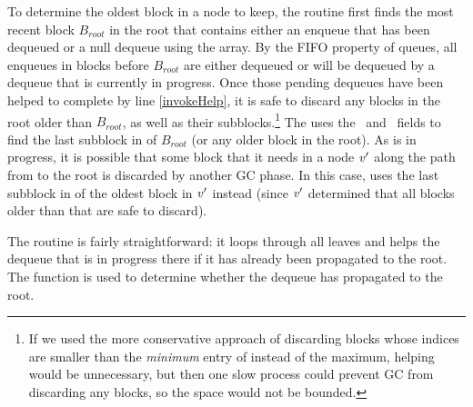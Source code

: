 To determine the oldest block in a node  to keep, the  routine  first
finds the most recent block $B_{root}$ in the root that contains either an enqueue that has been dequeued
or a null dequeue using the  array.  By the FIFO property of queues, all enqueues in blocks before $B_{root}$ are either
dequeued or will be dequeued by a dequeue that is currently in progress.  Once those pending dequeues have been
helped to complete by line \ref{invokeHelp},
it is safe to discard any blocks in the root older than $B_{root}$, as well
as their subblocks.\footnote{If we used the more conservative approach of discarding blocks whose indices 
are smaller than the \emph{minimum} entry of  instead of the maximum, helping would be unnecessary, but then one slow process could prevent GC from discarding any blocks, so the space would not be bounded.}
The  uses the \eleft\ and \eright\ fields to find the last subblock in 
of $B_{root}$ (or any older block in the root).
As  is in progress, it is possible that some block that it needs in a node $\mbox{\textnormal{\textit{v}}}'$
along the path from  to the root is discarded by another GC phase.
In this case,  uses the last subblock in  of the oldest block in $\mbox{\textnormal{\textit{v}}}'$ instead
(since $\mbox{\textnormal{\textit{v}}}'$ determined that all blocks older than that are safe to discard).

The  routine is fairly straightforward:  it loops through all leaves and
helps the dequeue that is in progress there if it has already been propagated to the root.
The  function is used to determine whether the dequeue has propagated to the root.

\renewcommand{\algorithmiccomment}[1]{\hfill\eqparbox{COMMENTDOUBLE}{\com\ #1}}

